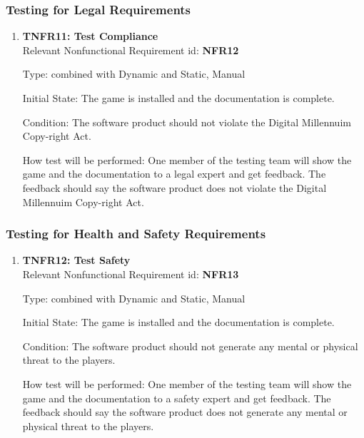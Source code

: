 \documentclass[12pt, titlepage]{article}
\begin{document}
\subsubsection{Testing for Legal Requirements}
\begin{enumerate}
\item{\textbf{TNFR11: Test Compliance\\}}
Relevant Nonfunctional Requirement id: \textbf{NFR12}

Type: combined with Dynamic and Static, Manual

Initial State: The game is installed and the documentation is complete.

Condition: The software product should not violate the Digital Millennuim Copy-right Act\cite{act}.

How test will be performed: One member of the testing team will show the game and the documentation to a legal expert and get feedback. The feedback should say the software product does not violate the Digital Millennuim Copy-right Act\cite{act}.

\end{enumerate}

\subsubsection{Testing for Health and Safety Requirements}
\begin{enumerate}
\item{\textbf{TNFR12: Test Safety \\}}
Relevant Nonfunctional Requirement id: \textbf{NFR13}

Type: combined with Dynamic and Static, Manual

Initial State: The game is installed and the documentation is complete.

Condition: The software product should not generate any mental or physical threat to the players.

How test will be performed: One member of the testing team will show the game and the documentation to a safety expert and get feedback. The feedback should say the software product does not generate any mental or physical threat to the players.



\end{enumerate}
\end{document}
